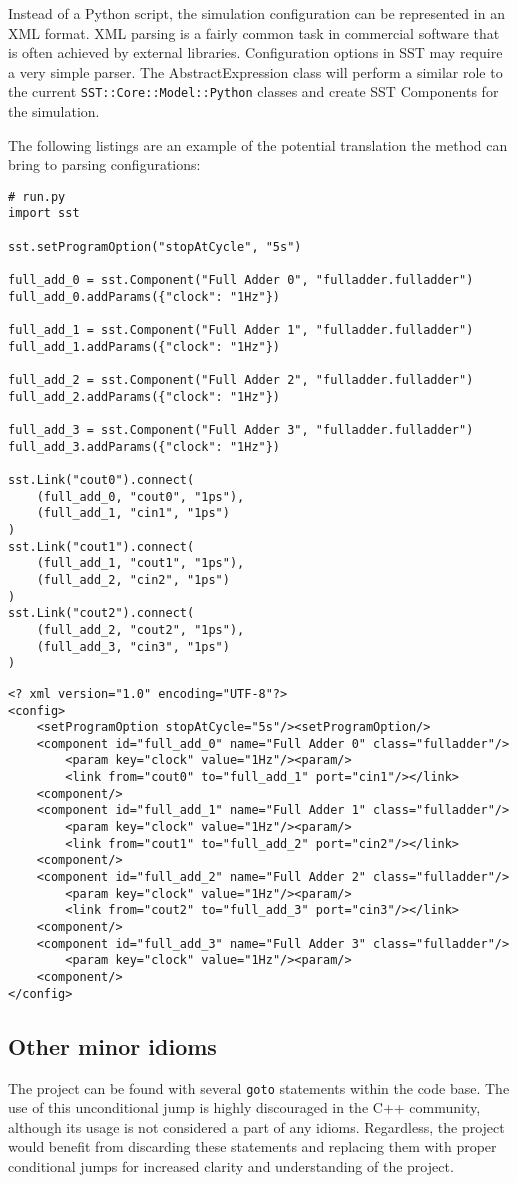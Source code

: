 Instead of a Python script, the simulation configuration can be represented in an XML format. XML parsing is a fairly common task in commercial software that is often achieved by external libraries. Configuration options in SST may require a very simple parser. The AbstractExpression class will perform a similar role to the current \texttt{SST::Core::Model::Python} classes and create SST Components for the simulation.

The following listings are an example of the potential translation the method can bring to parsing configurations:
\begin{lstlisting}[style=customPython]
# run.py
import sst

sst.setProgramOption("stopAtCycle", "5s")

full_add_0 = sst.Component("Full Adder 0", "fulladder.fulladder")
full_add_0.addParams({"clock": "1Hz"})

full_add_1 = sst.Component("Full Adder 1", "fulladder.fulladder")
full_add_1.addParams({"clock": "1Hz"})

full_add_2 = sst.Component("Full Adder 2", "fulladder.fulladder")
full_add_2.addParams({"clock": "1Hz"})

full_add_3 = sst.Component("Full Adder 3", "fulladder.fulladder")
full_add_3.addParams({"clock": "1Hz"})

sst.Link("cout0").connect(
    (full_add_0, "cout0", "1ps"),
    (full_add_1, "cin1", "1ps")
)
sst.Link("cout1").connect(
    (full_add_1, "cout1", "1ps"),
    (full_add_2, "cin2", "1ps")
)
sst.Link("cout2").connect(
    (full_add_2, "cout2", "1ps"),
    (full_add_3, "cin3", "1ps")
)
\end{lstlisting}

\begin{lstlisting}[style=customXML]
<? xml version="1.0" encoding="UTF-8"?>
<config>
    <setProgramOption stopAtCycle="5s"/><setProgramOption/>
    <component id="full_add_0" name="Full Adder 0" class="fulladder"/>
        <param key="clock" value="1Hz"/><param/>
        <link from="cout0" to="full_add_1" port="cin1"/></link>
    <component/>
    <component id="full_add_1" name="Full Adder 1" class="fulladder"/>
        <param key="clock" value="1Hz"/><param/>
        <link from="cout1" to="full_add_2" port="cin2"/></link>
    <component/>
    <component id="full_add_2" name="Full Adder 2" class="fulladder"/>
        <param key="clock" value="1Hz"/><param/>
        <link from="cout2" to="full_add_3" port="cin3"/></link>
    <component/>
    <component id="full_add_3" name="Full Adder 3" class="fulladder"/>
        <param key="clock" value="1Hz"/><param/>
    <component/>
</config>
\end{lstlisting}

\subsection{Other minor idioms}
The project can be found with several \texttt{goto} statements within the code base. The use of this unconditional jump is highly discouraged in the C++ community, although its usage is not considered a part of any idioms. Regardless, the project would benefit from discarding these statements and replacing them with proper conditional jumps for increased clarity and understanding of the project.
